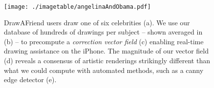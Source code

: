 \begin{figure}[!t]
  \centering%
\texttt{[image: ./imagetable/angelinaAndObama.pdf]}

  \caption{DrawAFriend users draw one of six celebrities (a). We use our database of hundreds of drawings per subject -- shown averaged in (b) -- to precompute a \emph{correction vector field} (c) enabling real-time drawing assistance on the iPhone. The magnitude of our vector field (d) reveals a consensus of artistic renderings strikingly different than what we could compute with automated methods, such as a canny edge detector (e).}
  \label{fig:image-table}
\end{figure}





